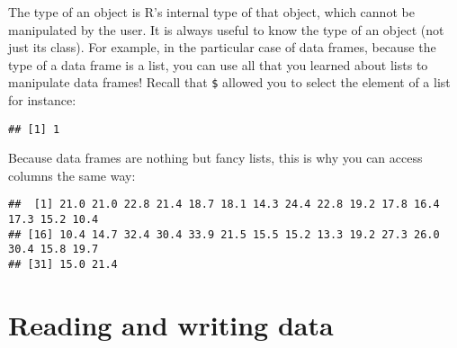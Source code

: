 \documentclass[
]{article}
\newenvironment{Shaded}{\begin{snugshade}}{\end{snugshade}}
\newcommand{\DecValTok}[1]{\textcolor[rgb]{0.00,0.00,0.81}{#1}}
\newcommand{\KeywordTok}[1]{\textcolor[rgb]{0.13,0.29,0.53}{\textbf{#1}}}
\newcommand{\NormalTok}[1]{#1}
\newcommand{\OperatorTok}[1]{\textcolor[rgb]{0.81,0.36,0.00}{\textbf{#1}}}
\newcommand{\StringTok}[1]{\textcolor[rgb]{0.31,0.60,0.02}{#1}}
\begin{document}
The type of an object is R's internal type of that object, which cannot be manipulated by the user.
It is always useful to know the type of an object (not just its class). For example, in the particular
case of data frames, because the type of a data frame is a list, you can use all that you learned
about lists to manipulate data frames! Recall that \texttt{\$} allowed you to select the element of a list
for instance:

\begin{Shaded}
\end{Shaded}

\begin{verbatim}
## [1] 1
\end{verbatim}

Because data frames are nothing but fancy lists, this is why you can access columns the same way:

\begin{Shaded}
\end{Shaded}

\begin{verbatim}
##  [1] 21.0 21.0 22.8 21.4 18.7 18.1 14.3 24.4 22.8 19.2 17.8 16.4 17.3 15.2 10.4
## [16] 10.4 14.7 32.4 30.4 33.9 21.5 15.5 15.2 13.3 19.2 27.3 26.0 30.4 15.8 19.7
## [31] 15.0 21.4
\end{verbatim}

\hypertarget{reading-and-writing-data}{%
\section{Reading and writing data}\label{reading-and-writing-data}}
\end{document}
